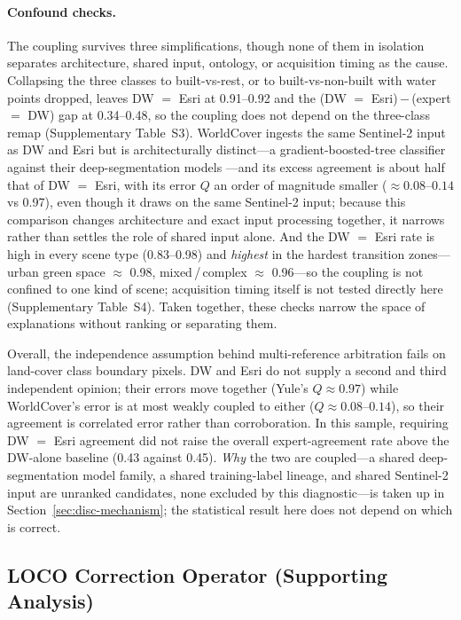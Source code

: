 \documentclass[remotesensing,article,submit,moreauthors]{Definitions/mdpi}
\begin{document}
\paragraph{Confound checks.}
The coupling survives three simplifications, though none of them in isolation
separates architecture, shared input, ontology, or acquisition timing as the
cause. Collapsing the three classes to
built-vs-rest, or to built-vs-non-built with water points dropped, leaves DW
$=$ Esri at 0.91--0.92 and the (DW $=$ Esri)\,$-$\,(expert $=$ DW) gap at
0.34--0.48, so the coupling does not depend on the three-class remap
(Supplementary Table~S3). WorldCover ingests the same Sentinel-2 input as DW
and Esri but is architecturally distinct---a gradient-boosted-tree classifier
against their deep-segmentation models \citep{zanaga2022,brown2022,karra2021}---and
its excess agreement is about half that of DW $=$ Esri, with its error $Q$ an
order of magnitude smaller ($\approx 0.08$--$0.14$ vs 0.97), even though it draws on the
same Sentinel-2 input; because this comparison changes architecture and exact
input processing together, it narrows rather than settles the role of shared
input alone. And the DW $=$ Esri rate is high in
every scene type (0.83--0.98) and
\emph{highest} in the hardest transition zones---urban green space $\approx$
0.98, mixed\,/\,complex $\approx$ 0.96---so the coupling is not confined to
one kind of scene; acquisition timing itself is not tested directly here
(Supplementary Table~S4). Taken together, these
checks narrow the space of explanations without ranking or separating them.

Overall, the independence assumption behind multi-reference arbitration
fails on land-cover class boundary pixels. DW and Esri do not supply a second and third
independent opinion; their errors move together (Yule's $Q \approx 0.97$) while
WorldCover's error is at most weakly coupled to either ($Q \approx 0.08$--$0.14$), so their
agreement is correlated error rather than corroboration. In this sample,
requiring DW $=$ Esri agreement did not raise the overall expert-agreement
rate above the DW-alone baseline (0.43 against 0.45). \emph{Why} the two are
coupled---a shared deep-segmentation model family, a shared training-label
lineage, and shared Sentinel-2 input are unranked candidates, none excluded
by this diagnostic---is taken up in
Section~\ref{sec:disc-mechanism}; the statistical result here does not depend
on which is correct.

\subsection{LOCO Correction Operator (Supporting Analysis)}\label{sec:results-loco}
\end{document}
